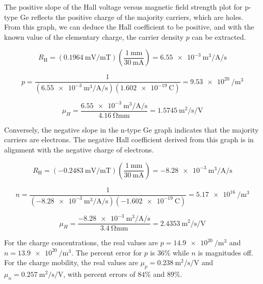 \documentclass[11pt]{article}
\begin{document}
	The positive slope of the Hall voltage versus magnetic field strength plot for p-type Ge reflects the positive charge of the majority carriers, which are holes. From this graph, we can deduce the Hall coefficient to be positive, and with the known value of the elementary charge, the carrier density \(p\) can be extracted.
	
	\begin{equation}
		R_\mathrm{H} = (\qty{0.1964}{\milli\volt\per\milli\tesla})\left( \frac{\qty{1}{\milli\meter}}{\qty{30}{\milli\ampere}} \right) = \qty{6.55e-3}{\meter\cubed\per\ampere\per\second}
	\end{equation}
	
	\begin{equation}
		p = \frac{1}{(\qty{6.55e-3}{\meter\cubed\per\ampere\per\second})(\qty{1.602e-19}{\coulomb})} = \qty{9.53e20}{\per\meter\cubed}
	\end{equation}
	
	\begin{equation}
		\mu_H = \frac{\qty{6.55e-3}{\meter\cubed\per\ampere\per\second}}{\qty{4.16}{\ohm\milli\meter}} = \qty{1.5745}{\meter\squared\per\second\per\volt}
	\end{equation}
	
	Conversely, the negative slope in the n-type Ge graph indicates that the majority carriers are electrons. The negative Hall coefficient derived from this graph is in alignment with the negative charge of electrons.
	
	\begin{equation}
		R_\mathrm{H} = (\qty{-0.2483}{\milli\volt\per\milli\tesla})\left( \frac{\qty{1}{\milli\meter}}{\qty{30}{\milli\ampere}} \right) = \qty{-8.28e-3}{\meter\cubed\per\ampere\per\second}
	\end{equation}
	
	\begin{equation}
		n = \frac{1}{(\qty{-8.28e-3}{\meter\cubed\per\ampere\per\second})(\qty{-1.602e-19}{\coulomb})} = \qty{5.17e16}{\per\meter\cubed}
	\end{equation}
	
	\begin{equation}
		\mu_H = \frac{\qty{-8.28e-3}{\meter\cubed\per\ampere\per\second}}{\qty{3.4}{\ohm\milli\meter}} = \qty{2.4353}{\meter\squared\per\second\per\volt}
	\end{equation}
	
	For the charge concentrations, the real values are $p=\qty{14.9e20}{\per\meter\cubed}$ and $n=\qty{13.9e20}{\per\meter\cubed}$. The percent error for $p$ is $36\%$ while $n$ is magnitudes off. For the charge mobility, the real values are $\mu_p = \qty{0.238}{\meter\squared\per\second\per\volt}$ and $\mu_n = \qty{0.257}{\meter\squared\per\second\per\volt}$, with percent errors of $84\%$ and $89\%$. 
	
\end{document}
